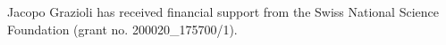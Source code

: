 \documentclass[draft]{agujournal2019}
\begin{document}



\acknowledgments
Jacopo Grazioli has received financial support from the Swiss National Science Foundation (grant no. 200020\_175700/1). 



%

%



%



%
%
%
%
%
\end{document}
